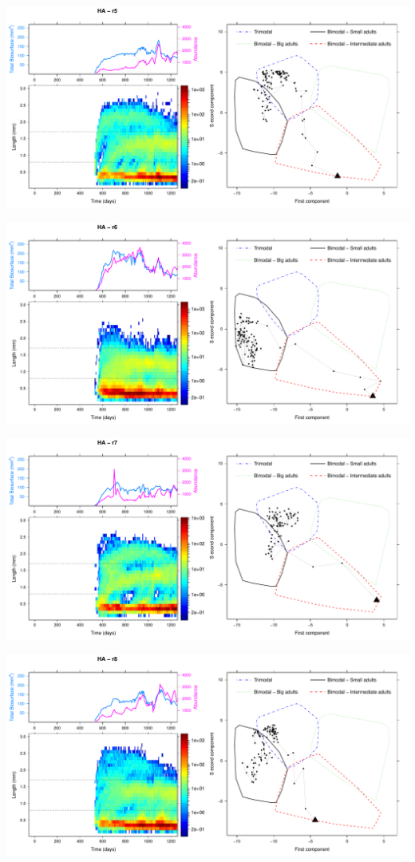 \includegraphics[height=0.33\textheight]{3-1_ChapExp1/Fig/HA-21-r5}

\includegraphics[height=0.33\textheight]{3-1_ChapExp1/Fig/HA-21-r6}

\includegraphics[height=0.33\textheight]{3-1_ChapExp1/Fig/HA-21-r7}

\includegraphics[height=0.33\textheight]{3-1_ChapExp1/Fig/HA-21-r8}

